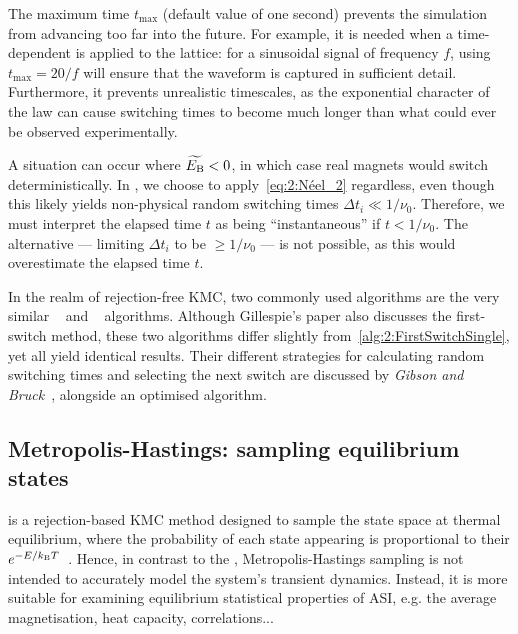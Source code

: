 The maximum time $t_\mathrm{max}$ (default value of one second) prevents the simulation from advancing too far into the future.
For example, it is needed when a time-dependent  is applied to the lattice: for a sinusoidal signal of frequency $f$, using $t_{\mathrm{max}}=20/f$ will ensure that the waveform is captured in sufficient detail.
Furthermore, it prevents unrealistic timescales, as the exponential character of the  law can cause switching times to become much longer than what could ever be observed experimentally. \par
A situation can occur where $\widetilde{E_\mathrm{B}} < 0$, in which case real magnets would switch deterministically.
In \hotspice, we choose to apply~\cref{eq:2:Néel_2} regardless, even though this likely yields non-physical random switching times $\Delta t_i \ll 1/\nu_0$.
Therefore, we must interpret the elapsed time $t$ as being ``instantaneous'' if $t < 1/\nu_0$.
The alternative --- limiting $\Delta t_i$ to be $\geq 1/\nu_0$ --- is not possible, as this would overestimate the elapsed time $t$. \par
In the realm of rejection-free KMC, two commonly used algorithms are the very similar ~\cite{nfoldMCalgorithm} and ~\cite{gillespie1976general} algorithms.
Although Gillespie's paper also discusses the first-switch method, these two algorithms differ slightly from~\cref{alg:2:FirstSwitchSingle}, yet all yield identical results.
Their different strategies for calculating random switching times and selecting the next switch are discussed by \textit{Gibson and Bruck}~\cite{GibsonBruck}, alongside an optimised algorithm.

\subsection{Metropolis-Hastings: sampling equilibrium states} \label{sec:2:Dynamics_MH}
 is a rejection-based KMC method designed to sample the state space at thermal equilibrium, where the probability of each state appearing is proportional to their  $e^{-E/\kBT}$~\cite{IntroductionMC,kyimba2006comparisonIsingAlgorithms}.
Hence, in contrast to the , Metropolis-Hastings sampling is not intended to accurately model the system's transient dynamics.
Instead, it is more suitable for examining equilibrium statistical properties of ASI, e.g. the average magnetisation, heat capacity, correlations...~\cite{ApparentFMpinwheel} \par

